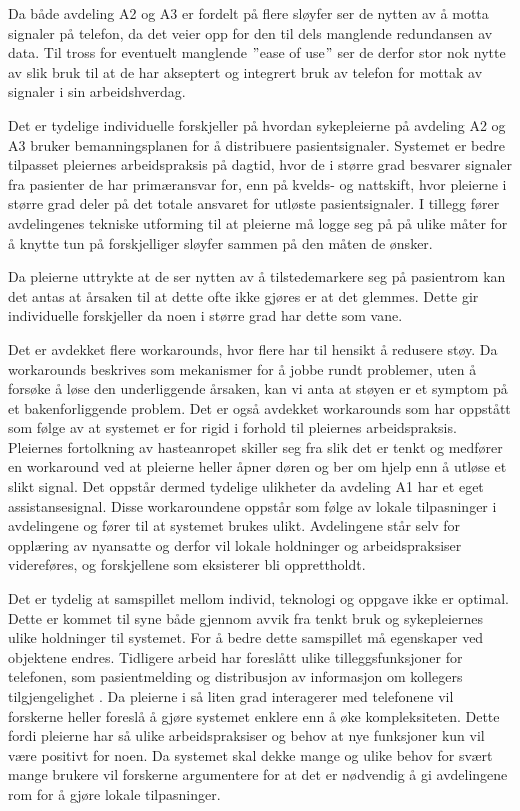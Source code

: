 \noindent
Da både avdeling A2 og A3 er fordelt på flere sløyfer ser de nytten av å motta signaler på telefon, da det veier opp for den til dels manglende redundansen av data. Til tross for eventuelt manglende $"$ease of use$"$ ser de derfor stor nok nytte av slik bruk til at de har akseptert og integrert bruk av telefon for mottak av signaler i sin arbeidshverdag.

\noindent
Det er tydelige individuelle forskjeller på hvordan sykepleierne på avdeling A2 og A3 bruker bemanningsplanen for å distribuere pasientsignaler. Systemet er bedre tilpasset pleiernes arbeidspraksis på dagtid, hvor de i større grad besvarer signaler fra pasienter de har primæransvar for, enn på kvelds- og nattskift, hvor pleierne i større grad deler på det totale ansvaret for utløste pasientsignaler. I tillegg fører avdelingenes tekniske utforming til at pleierne må logge seg på på ulike måter for å knytte tun på forskjelliger sløyfer sammen på den måten de ønsker. 

\noindent
Da pleierne uttrykte at de ser nytten av å tilstedemarkere seg på pasientrom kan det antas at årsaken til at dette ofte ikke gjøres er at det glemmes. Dette gir individuelle forskjeller da noen i større grad har dette som vane. 

\noindent
Det er avdekket flere workarounds, hvor flere har til hensikt å redusere støy. Da workarounds beskrives som mekanismer for å jobbe rundt problemer, uten å forsøke å løse den underliggende årsaken, kan vi anta at støyen er et symptom på et bakenforliggende problem. Det er også avdekket workarounds som har oppstått som følge av at systemet er for rigid i forhold til pleiernes arbeidspraksis. Pleiernes fortolkning av hasteanropet skiller seg fra slik det er tenkt og medfører en workaround ved at pleierne heller åpner døren og ber om hjelp enn å utløse et slikt signal. Det oppstår dermed tydelige ulikheter da avdeling A1 har et eget assistansesignal. Disse workaroundene oppstår som følge av lokale tilpasninger i avdelingene og fører til at systemet brukes ulikt. Avdelingene står selv for opplæring av nyansatte og derfor vil lokale holdninger og arbeidspraksiser videreføres, og forskjellene som eksisterer bli opprettholdt.    

\noindent
Det er tydelig at samspillet mellom individ, teknologi og oppgave ikke er optimal. Dette er kommet til syne både gjennom avvik fra tenkt bruk og sykepleiernes ulike holdninger til systemet. For å bedre dette samspillet må egenskaper ved objektene endres. Tidligere arbeid har foreslått ulike tilleggsfunksjoner for telefonen, som pasientmelding \citep{Rygh13, Selseth12} og distribusjon av informasjon om kollegers tilgjengelighet \citep{Sund13}. Da pleierne i så liten grad interagerer med telefonene vil forskerne heller foreslå å gjøre systemet enklere enn å øke kompleksiteten. Dette fordi pleierne har så ulike arbeidspraksiser og behov at nye funksjoner kun vil være positivt for noen. Da systemet skal dekke mange og ulike behov for svært mange brukere vil forskerne argumentere for at det er nødvendig å gi avdelingene rom for å gjøre lokale tilpasninger.